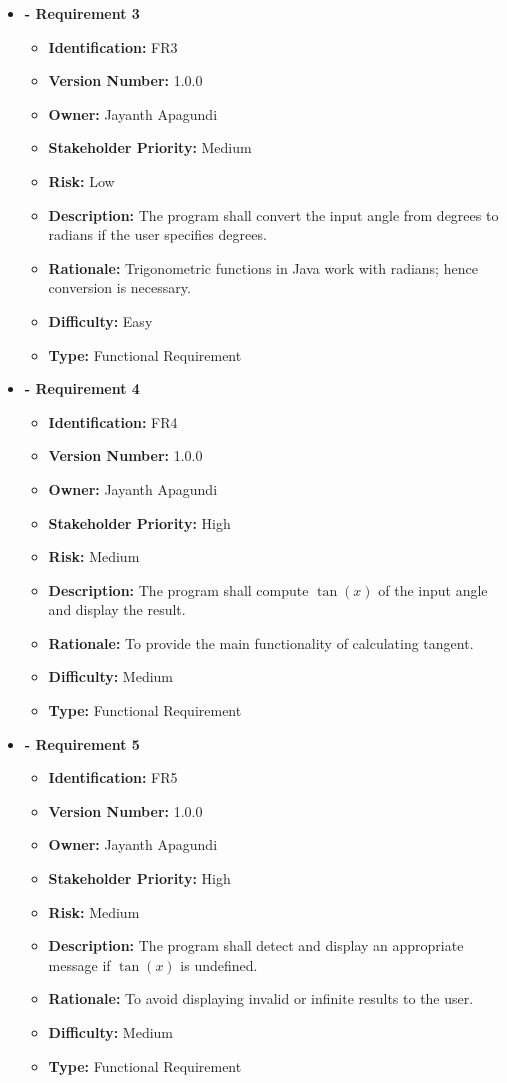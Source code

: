 \documentclass[11pt,a4paper,twoside]{article}
\begin{document}
\begin{itemize}[leftmargin=0pt,label={}]
\item \textbf{- Requirement 3}
\begin{itemize}
\item \textbf{Identification:} FR3
\item \textbf{Version Number:} 1.0.0
\item \textbf{Owner:} Jayanth Apagundi
\item \textbf{Stakeholder Priority:} Medium
\item \textbf{Risk:} Low
\item \textbf{Description:} The program shall convert the input angle from degrees to radians if the user specifies degrees.
\item \textbf{Rationale:} Trigonometric functions in Java work with radians; hence conversion is necessary.
\item \textbf{Difficulty:} Easy
\item \textbf{Type:} Functional Requirement
\end{itemize}

\item \textbf{- Requirement 4}
\begin{itemize}
\item \textbf{Identification:} FR4
\item \textbf{Version Number:} 1.0.0
\item \textbf{Owner:} Jayanth Apagundi
\item \textbf{Stakeholder Priority:} High
\item \textbf{Risk:} Medium
\item \textbf{Description:} The program shall compute $\tan(x)$ of the input angle and display the result.
\item \textbf{Rationale:} To provide the main functionality of calculating tangent.
\item \textbf{Difficulty:} Medium
\item \textbf{Type:} Functional Requirement
\end{itemize}

\item \textbf{- Requirement 5}
\begin{itemize}
\item \textbf{Identification:} FR5
\item \textbf{Version Number:} 1.0.0
\item \textbf{Owner:} Jayanth Apagundi
\item \textbf{Stakeholder Priority:} High
\item \textbf{Risk:} Medium
\item \textbf{Description:} The program shall detect and display an appropriate message if $\tan(x)$ is undefined.
\item \textbf{Rationale:} To avoid displaying invalid or infinite results to the user.
\item \textbf{Difficulty:} Medium
\item \textbf{Type:} Functional Requirement
\end{itemize}


\end{itemize}
\end{document}
